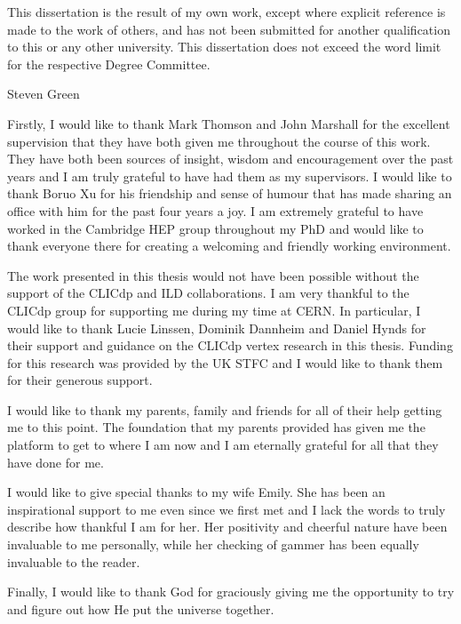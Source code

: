 \begin{declaration}
This dissertation is the result of my own work, except where explicit reference is made to the work of others, and has not been submitted for another qualification to this or any other university. This dissertation does not exceed the word limit for the respective Degree Committee.
  \vspace*{1cm}
  \begin{flushright}
    Steven Green
  \end{flushright}
\end{declaration}

\begin{acknowledgements}
Firstly, I would like to thank Mark Thomson and John Marshall for the excellent supervision that they have both given me throughout the course of this work.  They have both been sources of insight, wisdom and encouragement over the past years and I am truly grateful to have had them as my supervisors.  I would like to thank Boruo Xu for his friendship and sense of humour that has made sharing an office with him for the past four years a joy.  I am extremely grateful to have worked in the Cambridge HEP group throughout my PhD and would like to thank everyone there for creating a welcoming and friendly working environment.  

The work presented in this thesis would not have been possible without the support of the CLICdp and ILD collaborations.  I am very thankful to the CLICdp group for supporting me during my time at CERN.  In particular, I would like to thank Lucie Linssen, Dominik Dannheim and Daniel Hynds for their support and guidance on the CLICdp vertex research in this thesis.  Funding for this research was provided by the UK STFC and I would like to thank them for their generous support. 

I would like to thank my parents, family and friends for all of their help getting me to this point.  The foundation that my parents provided has given me the platform to get to where I am now and I am eternally grateful for all that they have done for me.  

I would like to give special thanks to my wife Emily.  She has been an inspirational support to me even since we first met and I lack the words to truly describe how thankful I am for her.  Her positivity and cheerful nature have been invaluable to me personally, while her checking of gammer has been equally invaluable to the reader.  

Finally, I would like to thank God for graciously giving me the opportunity to try and figure out how He put the universe together.  

\end{acknowledgements}

